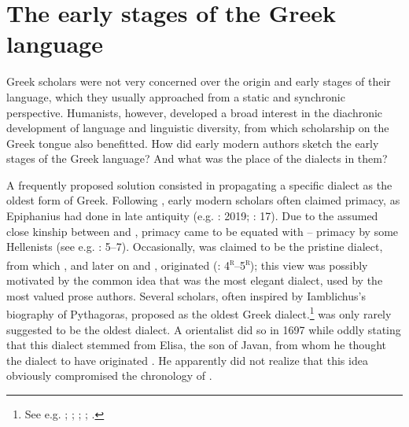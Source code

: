 \section{The early stages of the Greek language}\label{sec:5.4}

Greek scholars were not very concerned over the origin and early stages of their language, which they usually approached from a static and synchronic perspective. Humanists, however, developed a broad interest in the diachronic development of language and linguistic diversity, from which scholarship on the Greek tongue also benefitted. How did early modern authors sketch the early stages of the Greek language? And what was the place of the dialects in them?

A frequently proposed solution consisted in propagating a specific dialect as the oldest form of Greek. Following , early modern scholars often claimed  primacy, as Epiphanius had done in late antiquity (e.g. \citealt{Alsted1630}: 2019; \citealt{Von1705}: 17). Due to the assumed close kinship between  and ,  primacy came to be equated with – primacy by some Hellenists (see e.g. \citealt{Schmidt1604}: 5–7). Occasionally,  was claimed to be the pristine dialect, from which , and later on  and , originated (\citealt{Baile1588}: 4\textsc{\textsuperscript{r}}–5\textsc{\textsuperscript{r}}); this view was possibly motivated by the common idea that  was the most elegant dialect, used by the most valued prose authors. Several scholars, often inspired by Iamblichus’s biography of Pythagoras, proposed  as the oldest Greek dialect.\footnote{See e.g. \citet[860]{Goropius1569}; \citet[29]{Burton1657}; \citet[118]{Mazzocchi1754}; \citet[\textsc{iv}]{Facius1782}; \citet[21]{Gedike1782}.}  was only rarely suggested to be the oldest dialect. A  orientalist did so in 1697 while oddly stating that this dialect stemmed from Elisa, the son of Javan, from whom he thought the  dialect to have originated \citep[110]{Thomassin1697}. He apparently did not realize that this idea obviously compromised the chronology of .

